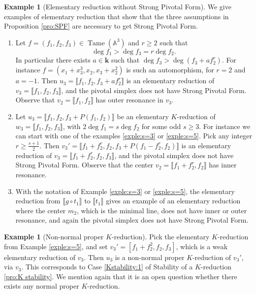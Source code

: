 \documentclass[reqno,oneside,11pt]{amsart}
\theoremstyle{plain}
\theoremstyle{definition}
\newtheorem{example}[theorem]{Example}
\newcommand{\A}{{\mathbb{A}}}
\newcommand{\K}{\mathbf{k}}
\DeclareMathOperator{\Tame}{Tame}
\newcommand{\TA}{\Tame(\A^3)}
\newcommand{\llb}{\llbracket}
\newcommand{\rrb}{\rrbracket}
\renewcommand{\ge}{\geqslant}
\begin{document}
\begin{example}[Elementary reduction without Strong Pivotal Form] \label{exple:noSPF}
We give examples of elementary reduction that show that the three assumptions in Proposition \ref{pro:SPF} are necessary to get Strong Pivotal Form.
\begin{enumerate}[wide]
\item Let $f = (f_1, f_2, f_3) \in \TA$ and $r \ge 2$ such that
$$\deg f_1 > \deg f_3 = r\deg f_2.$$
In particular there exists $a \in \K$ such that $\deg f_3 > \deg (f_3 + a f_2^r)$.
For instance $f= (x_1 + x_3^3, x_2, x_3 + x_2^2)$ is such an automorphism, for $r = 2$ and $a = -1$.
Then $u_3 = \llb f_1, f_2, f_3 + a f_2^r \rrb$ is an elementary reduction of $v_3 = \llb f_1, f_2, f_3 \rrb$, and the pivotal simplex does not have Strong Pivotal Form.
Observe that $v_2 = \llb f_1, f_2 \rrb$ has outer resonance in $v_3$.

\item Let $u_3 = \llb f_1, f_2, f_3 + P(f_1,f_2)\rrb$ be an elementary $K$-reduction of $w_3 = \llb f_1, f_2, f_3 \rrb$, with $2\deg f_1 = s\deg f_2$ for some odd $s \ge 3$.
For instance we can start with one of the examples \ref{exple:s=3} or \ref{exple:s=5}.
Pick any integer $r \ge \frac{s+1}{2}$.
Then $v_3' = \llb f_1+f_2^r, f_2, f_3 + P(f_1-f_2^r,f_2) \rrb$ is an elementary reduction of $v_3 = \llb f_1 + f_2^r, f_2, f_3 \rrb$, and the pivotal simplex does not have Strong Pivotal Form.
Observe that the center $v_2 = \llb f_1 + f_2^r, f_2 \rrb$ has inner resonance.

\item With the notation of Example \ref{exple:s=3} or \ref{exple:s=5}, the elementary reduction from $\llb g \circ t_1 \rrb$ to $\llb t_1 \rrb$ gives an example of an elementary reduction where the center $m_2$, which is the minimal line, does not have inner or outer resonance, and again the pivotal simplex does not have Strong Pivotal Form.
\end{enumerate}
\end{example}

\begin{example}[Non-normal proper $K$-reduction]
Pick the elementary $K$-reduction from Example \ref{exple:s=5}, and set $v_3' = [f_1 + f_2^2, f_2, f_3]$, which is a weak elementary reduction of $v_3$.
Then $u_3$ is a non-normal proper $K$-reduction of $v_3'$, via $v_3$.
This corresponds to Case \ref{Kstability:1} of Stability of a $K$-reduction
\ref{pro:K stability}.
We mention again that it is an open question whether there exists any normal proper $K$-reduction.
\end{example}
\end{document}
